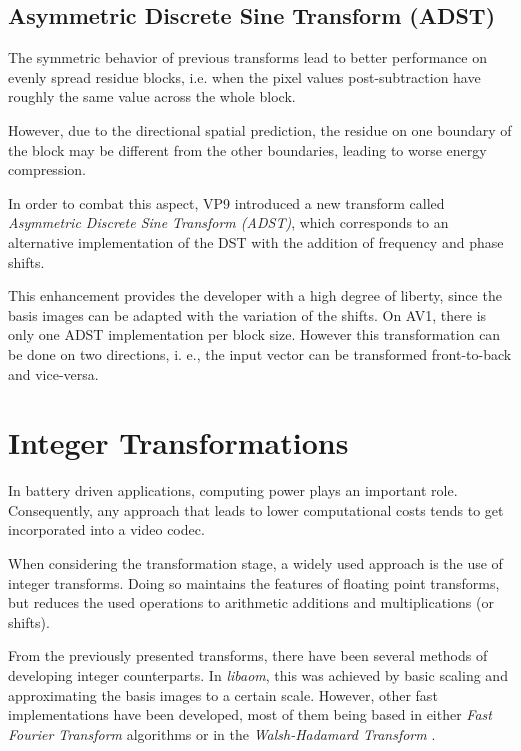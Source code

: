 \subsection{Asymmetric Discrete Sine Transform (ADST)}

\nocite{hanButterflyStructuredDesign2013}
\nocite{bingNextgenerationVideoCoding2015}

The symmetric behavior of previous transforms lead to better performance on evenly spread residue blocks, i.e. when the pixel values post-subtraction have roughly the same value across the whole block.

However, due to the directional spatial prediction, the residue on one boundary of the block may be different from the other boundaries, leading to worse energy compression.

In order to combat this aspect, VP9 introduced a new transform called \emph{Asymmetric Discrete Sine Transform (ADST)}, which corresponds to an alternative implementation of the DST with the addition of frequency and phase shifts.

This enhancement provides the developer with a high degree of liberty, since the basis images can be adapted with the variation of the shifts. On AV1, there is only one ADST implementation per block size. However this transformation can be done on two directions, i. e., the input vector can be transformed front-to-back and vice-versa.


\section{Integer Transformations}
\nocite{soo-changpeiIntegerTransformsAnalogous2000}

In battery driven applications, computing power plays an important role. Consequently, any approach that leads to lower computational costs tends to get incorporated into a video codec.

When considering the transformation stage, a widely used approach is the use of integer transforms. Doing so maintains the features of floating point transforms, but reduces the used operations to arithmetic additions and multiplications (or shifts).

From the previously presented transforms, there have been several methods of developing integer counterparts. In \emph{libaom}, this was achieved by basic scaling and approximating the basis images to a certain scale. However, other fast implementations have been developed, most of them being based in either \emph{Fast Fourier Transform} algorithms or in the \emph{Walsh-Hadamard Transform} \cite{wolterParallelArchitecturesDiscrete1992,yonghongzengIntegerDCTsFast2001}.

